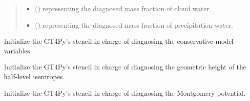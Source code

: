 \documentclass[letterpaper,10pt,english]{sphinxmanual}
\begin{document}
\begin{fulllineitems}
\begin{fulllineitems}
\begin{quote}
\begin{description}
\begin{itemize}
\item {} 
 () \textendash{}  representing the diagnosed mass fraction of cloud water.

\item {} 
 () \textendash{}  representing the diagnosed mass fraction of precipitation water.

\end{itemize}


\end{description}\end{quote}

\end{fulllineitems}


\begin{fulllineitems}
\label{\detokenize{api:dycore.diagnostic_isentropic.DiagnosticIsentropic._initialize_stencil_diagnosing_conservative_variables}}
Initialize the GT4Py’s stencil in charge of diagnosing the conservative model variables.

\end{fulllineitems}


\begin{fulllineitems}
\label{\detokenize{api:dycore.diagnostic_isentropic.DiagnosticIsentropic._initialize_stencil_diagnosing_height}}
Initialize the GT4Py’s stencil in charge of diagnosing the geometric height of the half-level isentropes.

\end{fulllineitems}


\begin{fulllineitems}
\label{\detokenize{api:dycore.diagnostic_isentropic.DiagnosticIsentropic._initialize_stencil_diagnosing_montgomery}}
Initialize the GT4Py’s stencil in charge of diagnosing the Montgomery potential.


\end{fulllineitems}
\end{fulllineitems}
\end{document}

